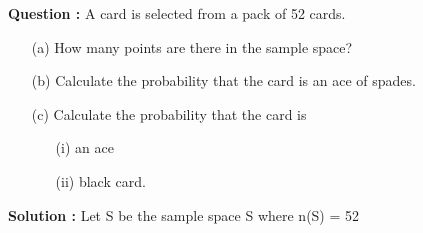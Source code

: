 \documentclass[journal,12pt,twocolumn]{IEEEtran}
\renewcommand\thesection{\arabic{section}}
\begin{document}
%


\textbf{Question : } A card is selected from a pack of 52 cards.
\begin{enumerate}
\item[(a)] How many points are there in the sample space?
\item[(b)] Calculate the probability that the card is an ace of spades.
\item[(c)] Calculate the probability that the card is 
\begin{enumerate}
\item[(i)] an ace
\item[(ii)] black card.
\end{enumerate}
\end{enumerate}
\textbf{Solution : }  
Let S be the sample space S where n(S) = 52
\end{document}
